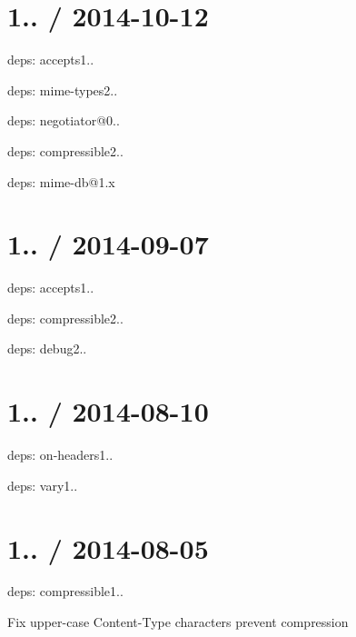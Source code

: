 \section*{1.. / 2014-\/10-\/12 }


\begin{DoxyItemize}
\item deps\+: accepts1..
\begin{DoxyItemize}
\item deps\+: mime-\/types2..
\item deps\+: negotiator@0..
\end{DoxyItemize}
\item deps\+: compressible2..
\begin{DoxyItemize}
\item deps\+: mime-\/db@1.\+x
\end{DoxyItemize}
\end{DoxyItemize}

\section*{1.. / 2014-\/09-\/07 }


\begin{DoxyItemize}
\item deps\+: accepts1..
\item deps\+: compressible2..
\item deps\+: debug2..
\end{DoxyItemize}

\section*{1.. / 2014-\/08-\/10 }


\begin{DoxyItemize}
\item deps\+: on-\/headers1..
\item deps\+: vary1..
\end{DoxyItemize}

\section*{1.. / 2014-\/08-\/05 }


\begin{DoxyItemize}
\item deps\+: compressible1..
\begin{DoxyItemize}
\item Fix upper-\/case Content-\/\+Type characters prevent compression
\end{DoxyItemize}
\end{DoxyItemize}

